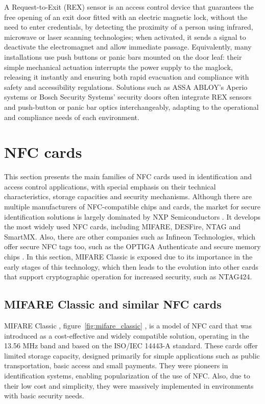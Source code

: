 A Request-to-Exit (REX) sensor is an access control device that guarantees the free opening of an exit door fitted with an electric magnetic lock, without the need to enter credentials, by detecting the proximity of a person using infrared, microwave or laser scanning technologies; when activated, it sends a signal to deactivate the electromagnet and allow immediate passage. Equivalently, many installations use push buttons or panic bars mounted on the door leaf: their simple mechanical actuation interrupts the power supply to the maglock, releasing it instantly and ensuring both rapid evacuation and compliance with safety and accessibility regulations. Solutions such as ASSA ABLOY's Aperio systems \cite{ref40} or Bosch Security Systems' security doors \cite{ref41} often integrate REX sensors and push-button or panic bar optics interchangeably, adapting to the operational and compliance needs of each environment.


\section{NFC cards}
\label{sec:NFCCards}

This section presents the main families of NFC cards used in identification and access control applications, with special emphasis on their technical characteristics, storage capacities and security mechanisms. Although there are multiple manufacturers of NFC-compatible chips and cards, the market for secure identification solutions is largely dominated by NXP Semiconductors \cite{ref80}. It develops the most widely used NFC cards, including MIFARE, DESFire, NTAG and SmartMX. Also, there are other companies such as Infineon Technologies, which offer secure NFC tags too, such as the OPTIGA Authenticate and secure memory chips \cite{ref82}. In this section, MIFARE Classic is exposed due to its importance in the early stages of this technology, which then leads to the evolution into other cards that support cryptographic operation for increased security, such as NTAG424.

\subsection{MIFARE Classic and similar NFC cards}

MIFARE Classic \cite{Ref28}, figure~\ref{fig:mifare_classic} \cite{ref81}, is a model of NFC card that was introduced as a cost-effective and widely compatible solution, operating in the 13.56 MHz band and based on the ISO/IEC 14443-A standard. These cards offer limited storage capacity, designed primarily for simple applications such as public transportation, basic access and small payments. They were pioneers in identification systems, enabling popularization of the use of NFC. Also, due to their low cost and simplicity, they were massively implemented in environments with basic security needs.


